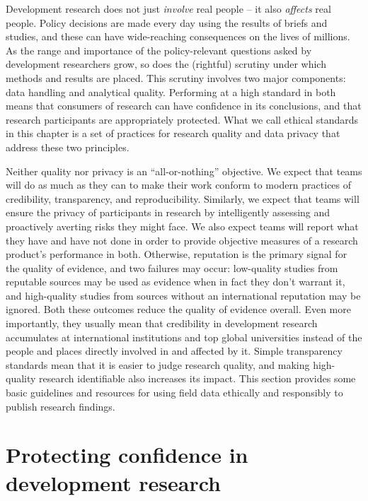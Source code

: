 
\begin{fullwidth}
Development research does not just \textit{involve} real people -- it also \textit{affects} real people.
Policy decisions are made every day using the results of briefs and studies,
and these can have wide-reaching consequences on the lives of millions.
As the range and importance of the policy-relevant questions
asked by development researchers grow,
so does the (rightful) scrutiny under which methods and results are placed.
This scrutiny involves two major components: data handling and analytical quality.
Performing at a high standard in both means that
consumers of research can have confidence in its conclusions,
and that research participants are appropriately protected.
What we call ethical standards in this chapter is a set of practices
for research quality and data privacy that address these two principles.

Neither quality nor privacy is an ``all-or-nothing'' objective.
We expect that teams will do as much as they can to make their work
conform to modern practices of credibility, transparency, and reproducibility.
Similarly, we expect that teams will ensure the privacy of participants in research
by intelligently assessing and proactively averting risks they might face.
We also expect teams will report what they have and have not done
in order to provide objective measures of a research product's performance in both.
Otherwise, reputation is the primary signal for the quality of evidence, and two failures may occur:
low-quality studies from reputable sources may be used as evidence when in fact they don't warrant it,
and high-quality studies from sources without an international reputation may be ignored.
Both these outcomes reduce the quality of evidence overall.
Even more importantly, they usually mean that credibility in development research accumulates at international institutions
and top global universities instead of the people and places directly involved in and affected by it.
Simple transparency standards mean that it is easier to judge research quality,
and making high-quality research identifiable also increases its impact.
This section provides some basic guidelines and resources
for using field data ethically and responsibly to publish research findings.
\end{fullwidth}


\section{Protecting confidence in development research}


